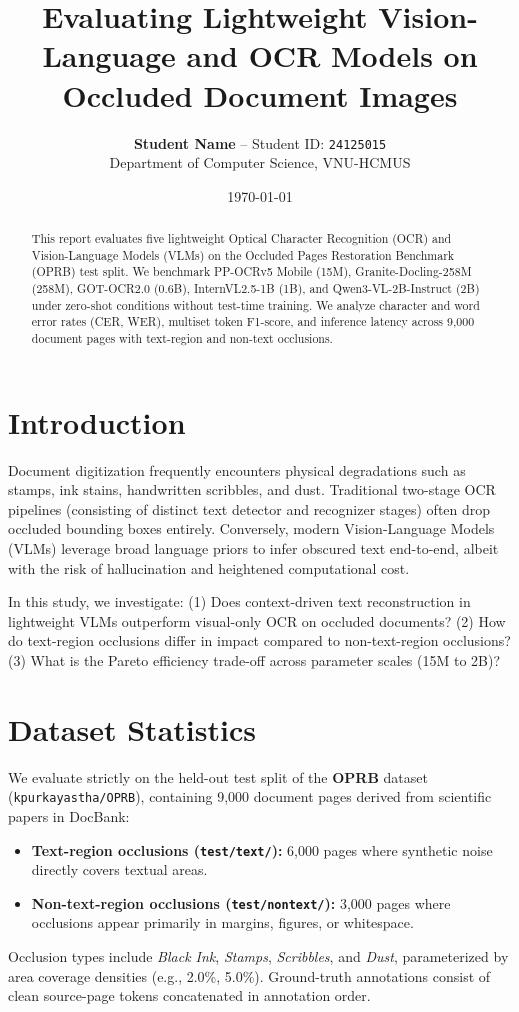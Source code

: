 \documentclass[10pt,twocolumn,a4paper]{article}
\title{\textbf{Evaluating Lightweight Vision-Language and OCR Models on Occluded Document Images}}
\author{\textbf{Student Name} -- Student ID: \texttt{24125015} \\ Department of Computer Science, VNU-HCMUS}
\date{\today}
\begin{document}
\maketitle

\begin{abstract}
This report evaluates five lightweight Optical Character Recognition (OCR) and Vision-Language Models (VLMs) on the Occluded Pages Restoration Benchmark (OPRB) test split. We benchmark PP-OCRv5 Mobile (15M), Granite-Docling-258M (258M), GOT-OCR2.0 (0.6B), InternVL2.5-1B (1B), and Qwen3-VL-2B-Instruct (2B) under zero-shot conditions without test-time training. We analyze character and word error rates (CER, WER), multiset token F1-score, and inference latency across 9,000 document pages with text-region and non-text occlusions.
\end{abstract}

\section{Introduction}
Document digitization frequently encounters physical degradations such as stamps, ink stains, handwritten scribbles, and dust. Traditional two-stage OCR pipelines (consisting of distinct text detector and recognizer stages) often drop occluded bounding boxes entirely. Conversely, modern Vision-Language Models (VLMs) leverage broad language priors to infer obscured text end-to-end, albeit with the risk of hallucination and heightened computational cost.

In this study, we investigate: (1) Does context-driven text reconstruction in lightweight VLMs outperform visual-only OCR on occluded documents? (2) How do text-region occlusions differ in impact compared to non-text-region occlusions? (3) What is the Pareto efficiency trade-off across parameter scales (15M to 2B)?

\section{Dataset Statistics}
We evaluate strictly on the held-out test split of the \textbf{OPRB} dataset (\texttt{kpurkayastha/OPRB}), containing 9,000 document pages derived from scientific papers in DocBank:
\begin{itemize}
    \item \textbf{Text-region occlusions (\texttt{test/text/}):} 6,000 pages where synthetic noise directly covers textual areas.
    \item \textbf{Non-text-region occlusions (\texttt{test/nontext/}):} 3,000 pages where occlusions appear primarily in margins, figures, or whitespace.
\end{itemize}
Occlusion types include \textit{Black Ink}, \textit{Stamps}, \textit{Scribbles}, and \textit{Dust}, parameterized by area coverage densities (e.g., 2.0\%, 5.0\%). Ground-truth annotations consist of clean source-page tokens concatenated in annotation order.
\end{document}
